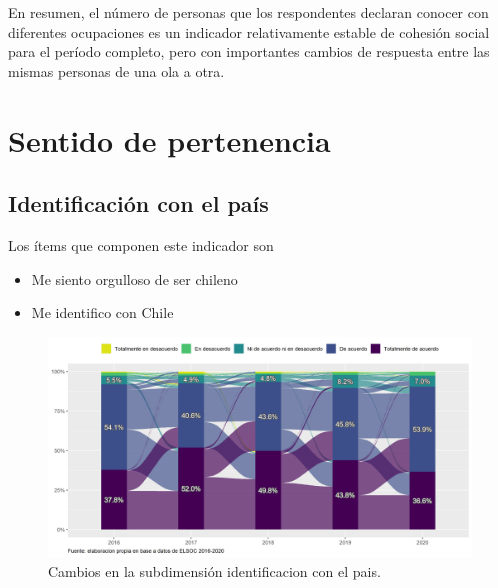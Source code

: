\documentclass[
  12pt,
]{book}
\begin{document}
En resumen, el número de personas que los respondentes declaran conocer con diferentes ocupaciones es un indicador relativamente estable de cohesión social para el período completo, pero con importantes cambios de respuesta entre las mismas personas de una ola a otra.

\hypertarget{sentido-de-pertenencia-1}{%
\section{Sentido de pertenencia}\label{sentido-de-pertenencia-1}}

\hypertarget{identificaciuxf3n-con-el-pauxeds}{%
\subsection{Identificación con el país}\label{identificaciuxf3n-con-el-pauxeds}}

Los ítems que componen este indicador son

\begin{itemize}
\item
  Me siento orgulloso de ser chileno
\item
  Me identifico con Chile
\end{itemize}

\begin{figure}[H]

{\centering \includegraphics[width=1\linewidth,height=1\textheight]{output/graphs/alluvial_identificacion} 

}

\caption{Cambios en la subdimensión identificacion con el pais.}\label{fig:alluvial-identificacion}
\end{figure}
\end{document}
